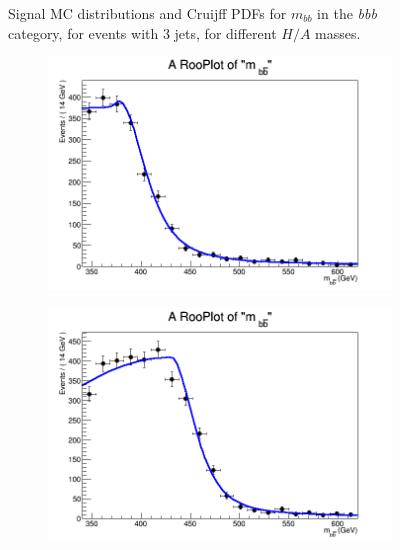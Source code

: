 \begin{figure}[phtb!]
\begin{center}
  \caption{Signal MC distributions and Cruijff PDFs for $m_{bb}$ in the {\it bbb} category, for events with 3 jets, for different $H/A$ masses. \label{fig:signalPDFs_3j}}
    \end{center}
\end{figure}


\begin{figure}[phtb!]
  \begin{center}
  \begin{subfigure}[$m_{A}=400$ GeV]{0.4\textwidth}\includegraphics[width=\textwidth]{FitResults/images/fitMC_bAbb400_2.png}\end{subfigure}
  \begin{subfigure}[$m_{A}=450$ GeV]{0.4\textwidth}\includegraphics[width=\textwidth]{FitResults/images/fitMC_bAbb450_2.png}\end{subfigure}

\end{center}
\end{figure}
